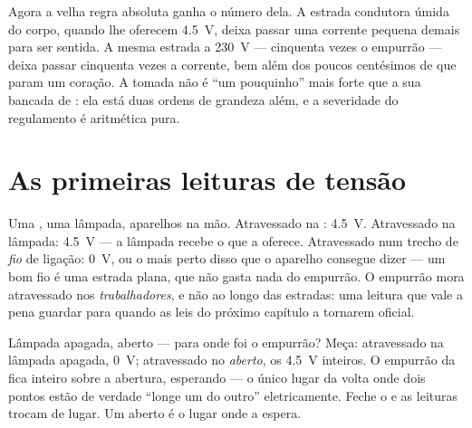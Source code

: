 \begin{remark}\label{rem:g8:voltage-voltmeter:mains}
Agora a velha regra absoluta ganha o número dela. A estrada
condutora úmida do corpo, quando lhe oferecem \qty{4.5}{V}, deixa
passar uma corrente pequena demais para ser sentida. A mesma estrada
a \qty{230}{V} --- cinquenta vezes o empurrão --- deixa passar
cinquenta vezes a corrente, bem além dos poucos centésimos de 
que param um coração. A tomada não é ``um pouquinho'' mais forte que
a sua bancada de : ela está duas ordens de grandeza além, e a
severidade do regulamento é aritmética pura.
\end{remark}

\section{As primeiras leituras de tensão}

\begin{example}\label{ex:g8:voltage-voltmeter:readings}
Uma , uma lâmpada, aparelhos na mão. Atravessado na :
\qty{4.5}{V}. Atravessado na lâmpada: \qty{4.5}{V} --- a lâmpada
recebe o que a  oferece. Atravessado num trecho de \emph{fio} de
ligação: \qty{0}{V}, ou o mais perto disso que o aparelho consegue
dizer --- um bom fio é uma estrada plana, que não gasta nada do
empurrão. O empurrão mora atravessado nos \emph{trabalhadores}, e não
ao longo das estradas: uma leitura que vale a pena guardar para
quando as leis do próximo capítulo a tornarem oficial.
\end{example}

\begin{example}\label{ex:g8:voltage-voltmeter:openswitch}
Lâmpada apagada,  aberto --- para onde foi o empurrão?
Meça: atravessado na lâmpada apagada, \qty{0}{V}; atravessado no
\emph{ aberto}, os \qty{4.5}{V} inteiros. O empurrão da
 fica inteiro sobre a abertura, esperando --- o único lugar da
volta onde dois pontos estão de verdade ``longe um do outro''
eletricamente. Feche o  e as leituras trocam de lugar. Um
 aberto é o lugar onde a  espera.
\end{example}

